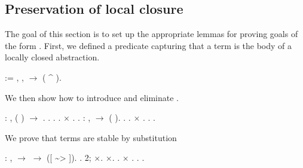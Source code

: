 \documentclass[12pt]{report}
\begin{document}
\subsection{Preservation of local closure}



 The goal of this section is to set up the appropriate lemmas 
    for proving goals of the form  . First, we defined a
    predicate capturing that a term  is the body of a locally
    closed abstraction. \begin{coqdoccode}
\coqdocemptyline
\coqdocnoindent
{}   :=\coqdoceol
\coqdocindent{1.00em}
\coqdoctac{\ensuremath{\exists}} , \coqdockw{\ensuremath{\forall}} ,    \ensuremath{\rightarrow}  ( \^{} ).\coqdoceol
\coqdocemptyline
\end{coqdoccode}
We then show how to introduce and eliminate  . \begin{coqdoccode}
\coqdocemptyline
\coqdocnoindent
{}  : \coqdockw{\ensuremath{\forall}} , \coqdoceol
\coqdocindent{1.00em}
 ( ) \ensuremath{\rightarrow}  .\coqdoceol
\coqdocnoindent
{}. .  . \ensuremath{\times} . .\coqdoceol
\coqdocemptyline
\coqdocnoindent
{}  : \coqdockw{\ensuremath{\forall}} , \coqdoceol
\coqdocindent{1.00em}
  \ensuremath{\rightarrow}  ( ).\coqdoceol
\coqdocnoindent
{}. . \ensuremath{\times} . .\coqdoceol
\coqdocemptyline
\coqdocnoindent
{}  .\coqdoceol
\coqdocemptyline
\end{coqdoccode}
We prove that terms are stable by substitution \begin{coqdoccode}
\coqdocemptyline
\coqdocnoindent
{}  : \coqdockw{\ensuremath{\forall}}   ,\coqdoceol
\coqdocindent{1.00em}
  \ensuremath{\rightarrow}   \ensuremath{\rightarrow}  ([ \~{}> ]).\coqdoceol
\coqdocnoindent
{}.\coqdoceol
\coqdocindent{1.00em}
 2; \ensuremath{\times}.\coqdoceol
\coqdocindent{1.00em}
\ensuremath{\times}.\coqdoceol
\coqdocindent{1.00em}
 . \ensuremath{\times} .\coqdoceol
\coqdocnoindent
{}.\coqdoceol
\coqdocemptyline
\coqdocnoindent
{} .\coqdoceol
\coqdocemptyline
\end{coqdoccode}
\end{document}
